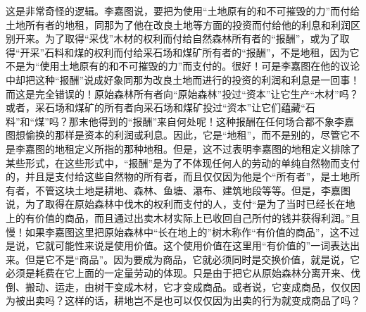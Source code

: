 这是非常奇怪的逻辑。李嘉图说，要把为使用“土地原有的和不可摧毁的力”而付给土地所有者的地租，同那为了他在改良土地等方面的投资而付给他的利息和利润区别开来。为了取得“采伐”木材的权利而付给自然森林所有者的“报酬”，或为了取得“开采”石料和煤的权利而付给采石场和煤矿所有者的“报酬”，不是地租，因为它不是为“使用土地原有的和不可摧毁的力”而支付的。很好！可是李嘉图在他的议论中却把这种“报酬”说成好象同那为改良土地而进行的投资的利润和利息是一回事！而这是完全错误的！原始森林所有者向“原始森林”投过“资本”让它生产“木材”吗？或者，采石场和煤矿的所有者向采石场和煤矿投过“资本”让它们蕴藏“石料”和“煤”吗？那末他得到的“报酬”来自何处呢！这种报酬在任何场合都不象李嘉图想偷换的那样是资本的利润或利息。因此，它是“地租”，而不是别的，尽管它不是李嘉图的地租定义所指的那种地租。但是，这不过表明李嘉图的地租定义排除了某些形式，在这些形式中，“报酬”是为了不体现任何人的劳动的单纯自然物而支付的，并且是支付给这些自然物的所有者，而且仅仅因为他是个“所有者”，是土地所有者，不管这块土地是耕地、森林、鱼塘、瀑布、建筑地段等等。但是，李嘉图说，为了取得在原始森林中伐木的权利而支付的人，支付“是为了当时已经长在地上的有价值的商品，而且通过出卖木材实际上已收回自己所付的钱并获得利润。”且慢！如果李嘉图这里把原始森林中“长在地上的”树木称作“有价值的商品”，这不过是说，它就可能性来说是使用价值。这个使用价值在这里用“有价值的”一词表达出来。但是它不是“商品”。因为要成为商品，它就必须同时是交换价值，就是说，它必须是耗费在它上面的一定量劳动的体现。只是由于把它从原始森林分离开来、伐倒、搬动、运走，由树干变成木材，它才变成商品。或者说，它变成商品，仅仅因为被出卖吗？这样的话，耕地岂不是也可以仅仅因为出卖的行为就变成商品了吗？


